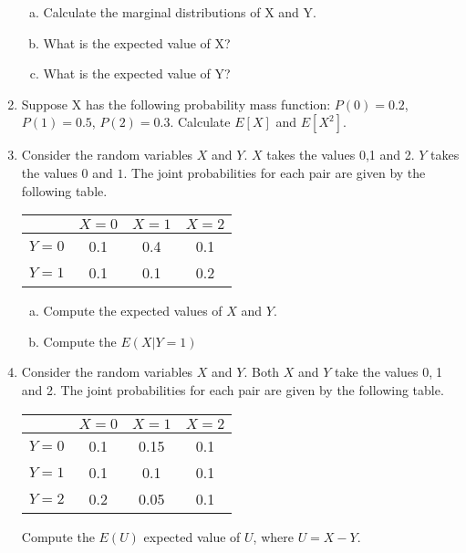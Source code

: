 \documentclass[]{article}
\begin{document}
\begin{enumerate}
\begin{center}
\begin{tabular}{|c||c|c|c|}
\end{tabular} 
\end{center}
 

\begin{enumerate}[(a)]
\item	Calculate the marginal distributions of X and Y.     
\item	What is the expected value of X?
\item	What is the expected value of Y?                 
\end{enumerate} 



\item 
Suppose X has the following probability mass function: $P(0) =
0.2$, $P(1) = 0.5$, $P(2) = 0.3$. Calculate $E[X]$ and $E[X^2]$.

\newpage

\item Consider the random variables $X$ and $Y$. $X$ takes the values 0,1 and 2. $Y$ takes the values $0$ and $1$.
The joint probabilities for each pair are given by the following table.
\begin{center}
\begin{tabular}{|c|c|c|c|}
\hline  & $X=0$ & $X=1$ & $X=2$  \\ 
\hline $Y=0$ & 0.1  & 0.4 & 0.1 \\ 
\hline  $Y=1$ & 0.1 & 0.1 & 0.2 \\ 
\hline 
\end{tabular} 
\end{center}
\begin{enumerate}[(a)]
\item Compute the expected values of $X$ and $Y$.
\item Compute the $E(X|Y=1)$
\end{enumerate}

\item Consider the random variables $X$ and $Y$. Both $X$ and $Y$ take the values 0,$\;$1 and 2. 
The joint probabilities for each pair are given by the following table.
\begin{center}
\begin{tabular}{|c|c|c|c|}
\hline  & $X=0$ & $X=1$ & $X=2$ \\ 
\hline $Y=0$ & 0.1 & 0.15 & 0.1 \\ 
\hline $Y=1$ & 0.1 & 0.1 & 0.1 \\ 
\hline $Y=2$ & 0.2 & 0.05 & 0.1 \\ 
\hline 
\end{tabular} 
\end{center}
Compute the $E(U)$ expected value of $U$, where $U=X-Y$.
\end{enumerate}
\end{document}
